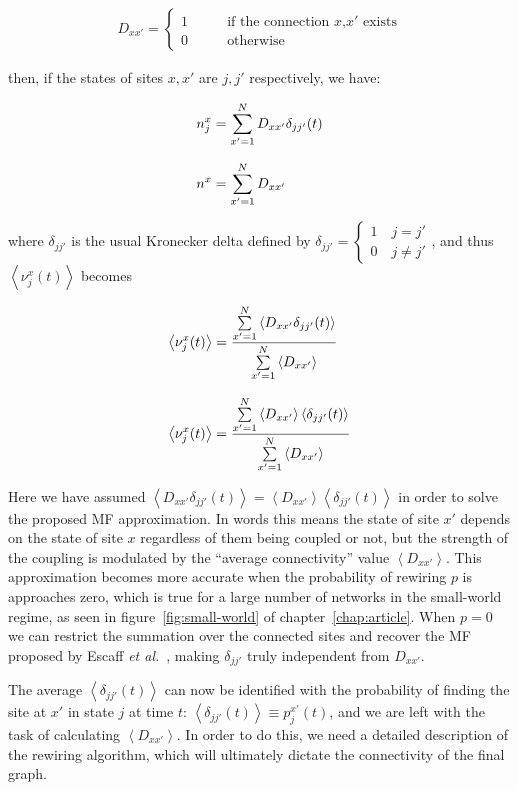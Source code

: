 \begin{align}
    D_{xx'} = 
    \begin{cases}
        1 \qquad &\text{if the connection $x$,$x'$ exists}\\
        0 \qquad &\text{otherwise}
    \end{cases}
\end{align}

\noindent then, if the states of sites $x,x'$ are $j,j'$ respectively, we have:

\begin{align}
    n^x_j &= \sum\limits_{x'=1}^ND_{xx'}\delta_{jj'}(t) \notag\\[8pt]
    n^x &= \sum\limits_{x'=1}^ND_{xx'}
\end{align}

\noindent where $\delta_{jj'}$ is the usual Kronecker delta defined by $\delta_{jj'}=\begin{cases}1 \quad j=j'\\0 \quad j\neq
j'\end{cases}$, and thus $\left< \nu^x_j(t) \right>$ becomes

\begin{align}
    \left< \nu^x_j(t) \right> &= \frac{\sum\limits_{x'=1}^N\left< D_{xx'}\delta_{jj'}(t)\right>}{\sum\limits_{x'=1}^N\left< D_{xx'} \right>}
    \notag \\[8pt]
    \left< \nu^x_j(t) \right> &= \frac{\sum\limits_{x'=1}^N\left< D_{xx'}\right>\left<\delta_{jj'}(t)\right>}{\sum\limits_{x'=1}^N\left< D_{xx'} \right>}
\end{align}

\noindent Here we have assumed $\left< D_{xx'}\delta_{jj'}(t)\right> = \left< D_{xx'}\right>\left<\delta_{jj'}(t)\right>$ in order to
solve the proposed MF approximation. In words this means the state of site $x'$ depends on the state of site $x$ regardless of them
being coupled or not, but the strength of the coupling is modulated by the ``average connectivity'' value $\left< D_{xx'} \right>$.
This approximation becomes more accurate when the probability of rewiring $p$ is approaches zero, which is true for a large number of
networks in the small-world regime, as seen in figure~\ref{fig:small-world} of chapter~\ref{chap:article}. When $p=0$ we can restrict
the summation over the connected sites and recover the MF proposed by Escaff \textit{et al.}~\cite{escaff2014arrays}, making
$\delta_{jj'}$ truly independent from $D_{xx'}$.

The average $\left< \delta_{jj'}(t) \right>$ can now be identified with the probability of finding the site at $x'$ in state $j$ at
time $t$: $\left< \delta_{jj'}(t) \right> \equiv p^{x'}_j(t)$, and we are left with the task of calculating $\left< D_{xx'} \right>$.
In order to do this, we need a detailed description of the rewiring algorithm, which will ultimately dictate the connectivity of the
final graph. 

